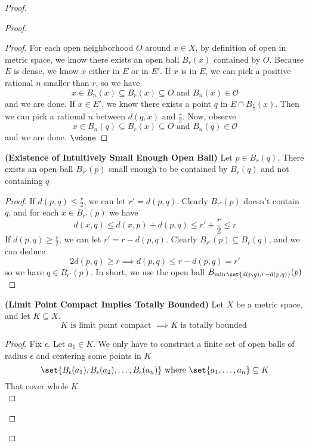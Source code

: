 \documentclass{report}
\begin{document}
\begin{proof}
\begin{proof}
\begin{proof}
For each open neighborhood $O$ around  $x\in X$, by definition of open in metric space, we know there exists an open ball $B_r(x)$ contained by $O$. Because $E$ is dense, we know  $x$ either in $E$ or in  $E'$. If $x$ is in  $E$, we can pick a positive rational  $n$ smaller than  $r$, so we have  
\begin{equation}
x\in B_n(x)\subseteq B_r(x)\subseteq O\text{ and }B_n(x)\in \mathcal{O} 
\end{equation}
and we are done. If $x\in E'$, we know there exists a point $q$ in  $E\cap B_{\frac{r}{2}}(x)$. Then we can pick a rational $n$ between $d(q,x)$ and $\frac{r}{2}$. Now, observe
\begin{equation}
x\in B_n(q)\subseteq B_r(x)\subseteq O\text{ and }B_n(q)\in \mathcal{O}
\end{equation}
and we are done. $\vdone$
\end{proof}
\begin{lemma}
\label{3.6.2}
\textbf{(Existence of Intuitively Small Enough Open Ball)} Let $p\in  B_r(q)$. There exists an open ball $B_{r'}(p)$ small enough to be contained by $B_r(q)$ and not containing $q$ 
\end{lemma}
\begin{proof}
If $d(p,q)\leq \frac{r}{2}$, we can let $r'=d(p,q)$. Clearly $B_{r'}(p)$ doesn't contain $q$, and for each  $x\in B_{r'}(p)$ we have
\begin{equation}
d(x,q)\leq d(x,p)+d(p,q)\leq r'+\frac{r}{2}\leq r
\end{equation}
If $d(p,q)\geq \frac{r}{2}$, we can let $r'=r-d(p,q)$. Clearly $B_{r'}(p)\subseteq B_r(q)$, and we can deduce
\begin{equation}
2d(p,q)\geq r\implies d(p,q)\leq r-d(p,q)=r'
\end{equation}
so we have $q\in B_{r'}(p)$. In short, we use the open ball  $B_{\min \set{d(p,q),r-d(p,q)}}(p)$
\end{proof}
\begin{theorem}
\label{3.6.3}
\textbf{(Limit Point Compact Implies Totally Bounded)} Let $X$ be a metric space, and let $K\subseteq X$.
\begin{equation}
K\text{ is limit point compact }\implies K\text{ is totally bounded }
\end{equation}
\end{theorem}
\begin{proof}
Fix $\epsilon $. Let $a_1\in K$. We only have to construct a finite set of open balls of radius $\epsilon $ and centering some points in $K$
\begin{equation}
\set{B_{\epsilon}(a_1),B_{\epsilon }(a_2),\dots ,B_{\epsilon }(a_n)}\text{ where }\set{a_1,\dots ,a_n}\subseteq K
\end{equation}
That cover whole $K$.\\


\end{proof}
\end{proof}
\end{proof}
\end{document}
